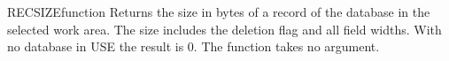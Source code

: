 \begin{XbaseEntry}{RECSIZE}{function}
Returns the size in bytes of a record of the database in the selected work area.
\Syntax
{}
\Usage
The size includes the deletion flag and all field widths.  With no database
in USE the result is 0.  The function takes no argument.
\Examples
{}
\end{XbaseEntry}

